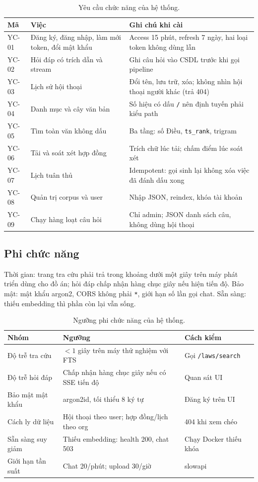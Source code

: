 \begin{table}[htp]
\centering
\caption{Yêu cầu chức năng của hệ thống.}
\label{tab:yc-cn}
\begin{tabular}{p{1.6cm}p{5.2cm}p{7.0cm}}
\toprule
\textbf{Mã} & \textbf{Việc} & \textbf{Ghi chú khi cài} \\
\midrule
YC-01 & Đăng ký, đăng nhập, làm mới token, đổi mật khẩu & Access 15 phút,
refresh 7 ngày, hai loại token không dùng lẫn \\
YC-02 & Hỏi đáp có trích dẫn và stream & Ghi câu hỏi vào CSDL trước khi gọi
pipeline \\
YC-03 & Lịch sử hội thoại & Đổi tên, lưu trữ, xóa; không nhìn hội thoại người
khác (trả 404) \\
YC-04 & Danh mục và cây văn bản & Số hiệu có dấu \texttt{/} nên định tuyến
phải kiểu path \\
YC-05 & Tìm toàn văn không dấu & Ba tầng: số Điều, \texttt{ts\_rank}, trigram \\
YC-06 & Tải và soát xét hợp đồng & Trích chữ lúc tải; chấm điểm lúc soát xét \\
YC-07 & Lịch tuân thủ & Idempotent: gọi sinh lại không xóa việc đã đánh dấu xong \\
YC-08 & Quản trị corpus và user & Nhập JSON, reindex, khóa tài khoản \\
YC-09 & Chạy hàng loạt câu hỏi & Chỉ admin; JSON danh sách câu, không dùng hội thoại \\
\bottomrule
\end{tabular}
\end{table}

\subsection{Phi chức năng}

Thời gian: trang tra cứu phải trả trong khoảng dưới một giây trên máy phát triển
dùng cho đồ án; hỏi
đáp chấp nhận hàng chục giây nếu hiện tiến độ. Bảo mật: mật khẩu argon2, CORS
không phải \texttt{*}, giới hạn số lần gọi chat. Sẵn sàng: thiếu embedding thì
phần còn lại vẫn sống.

\begin{table}[htp]
\centering
\caption{Ngưỡng phi chức năng của hệ thống.}
\label{tab:yc-phi-cn}
\begin{tabular}{p{3.2cm}p{5.0cm}p{5.5cm}}
\toprule
\textbf{Nhóm} & \textbf{Ngưỡng} & \textbf{Cách kiểm} \\
\midrule
Độ trễ tra cứu & $< 1$ giây trên máy thử nghiệm với FTS & Gọi \texttt{/laws/search} \\
Độ trễ hỏi đáp & Chấp nhận hàng chục giây nếu có SSE tiến độ & Quan sát UI \\
Bảo mật mật khẩu & argon2id, tối thiểu 8 ký tự & Đăng ký trên UI \\
Cách ly dữ liệu & Hội thoại theo user; hợp đồng/lịch theo org & 404 khi xem chéo \\
Sẵn sàng suy giảm & Thiếu embedding: health 200, chat 503 & Chạy Docker thiếu khóa \\
Giới hạn tần suất & Chat 20/phút; upload 30/giờ & slowapi \\
\bottomrule
\end{tabular}
\end{table}

